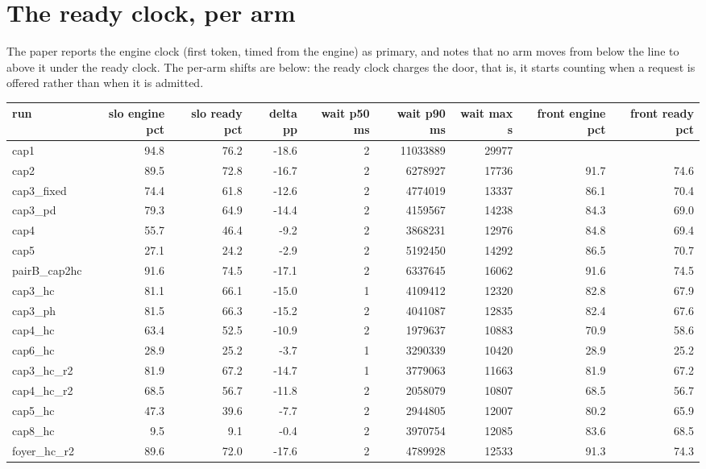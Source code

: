 \documentclass[10pt]{article}
\begin{document}
\section{The ready clock, per arm}

The paper reports the engine clock (first token, timed from the engine) as
primary, and notes that no arm moves from below the line to above it under the
ready clock. The per-arm shifts are below: the ready clock charges the door,
that is, it starts counting when a request is offered rather than when it is
admitted.
\begin{landscape}\begin{center}\footnotesize\setlength{\tabcolsep}{3pt}
\begin{tabular}{lrrrrrrrr}
\toprule
run & slo engine pct & slo ready pct & delta pp & wait p50 ms & wait p90 ms & wait max s & front engine pct & front ready pct \\
\midrule
cap1 & 94.8 & 76.2 & -18.6 & 2 & 11033889 & 29977 &  &  \\
cap2 & 89.5 & 72.8 & -16.7 & 2 & 6278927 & 17736 & 91.7 & 74.6 \\
cap3\_fixed & 74.4 & 61.8 & -12.6 & 2 & 4774019 & 13337 & 86.1 & 70.4 \\
cap3\_pd & 79.3 & 64.9 & -14.4 & 2 & 4159567 & 14238 & 84.3 & 69.0 \\
cap4 & 55.7 & 46.4 & -9.2 & 2 & 3868231 & 12976 & 84.8 & 69.4 \\
cap5 & 27.1 & 24.2 & -2.9 & 2 & 5192450 & 14292 & 86.5 & 70.7 \\
pairB\_cap2hc & 91.6 & 74.5 & -17.1 & 2 & 6337645 & 16062 & 91.6 & 74.5 \\
cap3\_hc & 81.1 & 66.1 & -15.0 & 1 & 4109412 & 12320 & 82.8 & 67.9 \\
cap3\_ph & 81.5 & 66.3 & -15.2 & 2 & 4041087 & 12835 & 82.4 & 67.6 \\
cap4\_hc & 63.4 & 52.5 & -10.9 & 2 & 1979637 & 10883 & 70.9 & 58.6 \\
cap6\_hc & 28.9 & 25.2 & -3.7 & 1 & 3290339 & 10420 & 28.9 & 25.2 \\
cap3\_hc\_r2 & 81.9 & 67.2 & -14.7 & 1 & 3779063 & 11663 & 81.9 & 67.2 \\
cap4\_hc\_r2 & 68.5 & 56.7 & -11.8 & 2 & 2058079 & 10807 & 68.5 & 56.7 \\
cap5\_hc & 47.3 & 39.6 & -7.7 & 2 & 2944805 & 12007 & 80.2 & 65.9 \\
cap8\_hc & 9.5 & 9.1 & -0.4 & 2 & 3970754 & 12085 & 83.6 & 68.5 \\
foyer\_hc\_r2 & 89.6 & 72.0 & -17.6 & 2 & 4789928 & 12533 & 91.3 & 74.3 \\

\end{tabular}
\end{center}
\end{landscape}
\end{document}
